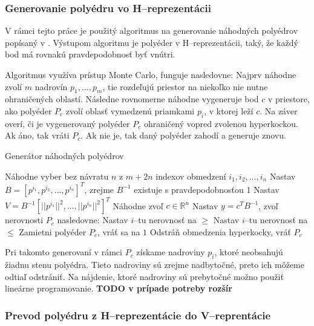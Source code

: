 \subsubsection{Generovanie polyédru vo H--reprezentácii}
V rámci tejto práce je použitý algoritmus na generovanie náhodných polyédrov popísaný v \cite{may}. Výstupom algoritmu je polyéder v H--reprezentácii, taký, že každý bod má rovnakú pravdepodobnosť byť vnútri. 

Algoritmus využíva prístup Monte Carlo, funguje nasledovne: Najprv náhodne zvolí $m$ nadrovín $p_1, \dots, p_m$, tie rozdeľujú priestor na niekoľko nie nutne ohraničených oblastí.
Následne rovnomerne náhodne vygeneruje bod $c$ v priestore, ako polyéder $P_c$ zvolí oblasť vymedzenú priamkami $p_i$, v ktorej leží $c$.
Na záver overí, či je vygenerovaný polyéder $P_c$ ohraničený vopred zvolenou hyperkockou. Ak áno, tak vráti $P_c$. Ak nie je, tak daný polyéder zahodí a generuje znovu.

\begin{algorithm}[H]
	\caption{Generátor náhodných polyédrov \cite{may}}
	\label{generator-polyedrov}
	\begin{algorithmic}[1]
		\State Náhodne vyber bez návratu $n$ z $m+2n$ indexov obmedzení $i_1, i_2, \dots, i_n$
		\State Nastav $B=[p^{i_1}, p^{i_2}, \dots, p^{i_n}]^T$, zrejme $B^{-1}$ existuje s pravdepodobnosťou 1
		\State Nastav $V=B^{-1}[||p^{i_1}||^2, \dots, ||p^{i_n}||^2]^T$
		\State Náhodne zvoľ $c \in \mathbb{R}^n$
		\State Nastav $y=c^TB^{-1}$, zvoľ nerovnosti $P_c$ nasledovne:
				\State Nastav $i$--tu nerovnosť na $\ge$
			\Else
				\State Nastav $i$--tu nerovnosť na $\le$
			\EndIf
		\EndFor
			\State Zamietni polyéder $P_c$, vráť sa na $1$
		\Else
			\State Odstráň obmedzenia hyperkocky, vráť $P_c$
		\EndIf
	\end{algorithmic}
\end{algorithm}

Pri takomto generovaní v rámci $P_c$ získame nadroviny $p_i$, ktoré neobsahujú žiadnu stenu polyédra. Tieto nadroviny sú zrejme nadbytočné, preto ich môžeme odtiaľ odstrániť.
Na nájdenie, ktoré nadroviny sú prebytočné možno použiť lineárne programovanie. \textbf{TODO v prípade potreby rozšír}


\subsubsection{Prevod polyédru z H--reprezentácie do V--reprentácie}

